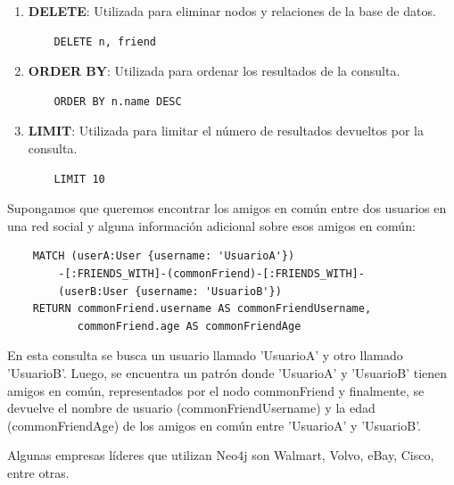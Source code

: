 \documentclass[pdflatex,sn-mathphys-num]{sn-jnl}
\theoremstyle{thmstyleone}%
\theoremstyle{thmstyletwo}%
\theoremstyle{thmstylethree}%
\begin{document}
\begin{enumerate}
    \vspace{-0.3cm}
    
    \item \textbf{DELETE}: Utilizada para eliminar nodos y relaciones de la base de datos.
    \begin{verbatim}
    DELETE n, friend
    \end{verbatim}

    \vspace{-0.3cm}
    
    \item \textbf{ORDER BY}: Utilizada para ordenar los resultados de la consulta.
    \begin{verbatim}
    ORDER BY n.name DESC
    \end{verbatim}

    \vspace{-0.3cm}
    
    \item \textbf{LIMIT}: Utilizada para limitar el número de resultados devueltos por la consulta.
    \begin{verbatim}
    LIMIT 10
    \end{verbatim}
\end{enumerate}

\vspace{-0.3cm}

Supongamos que queremos encontrar los amigos en común entre dos usuarios en una red social y alguna información adicional sobre esos amigos en común:
\vspace{0.2cm}
\begin{verbatim}
    MATCH (userA:User {username: 'UsuarioA'})
        -[:FRIENDS_WITH]-(commonFriend)-[:FRIENDS_WITH]-
        (userB:User {username: 'UsuarioB'})
    RETURN commonFriend.username AS commonFriendUsername,
           commonFriend.age AS commonFriendAge
\end{verbatim}

\vspace{0.2cm}

En esta consulta se busca un usuario llamado 'UsuarioA' y otro llamado 'UsuarioB'. Luego, se encuentra un patrón donde 'UsuarioA' y 'UsuarioB' tienen amigos en común, representados por el nodo commonFriend y finalmente, se devuelve el nombre de usuario (commonFriendUsername) y la edad (commonFriendAge) de los amigos en común entre 'UsuarioA' y 'UsuarioB'.

Algunas empresas líderes que utilizan Neo4j son Walmart, Volvo, eBay, Cisco, entre otras.
\end{document}
